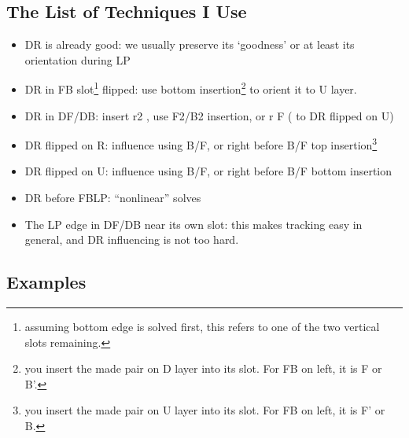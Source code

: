 \documentclass[12pt,letter]{article}
\begin{document}
\subsection{The List of Techniques I Use}

\begin{itemize}
    \item DR is already good: we usually preserve its ‘goodness’ or at least its orientation during LP
    
    \item DR in FB slot\footnote{assuming bottom edge is solved first, this refers to one of the two vertical slots remaining.} flipped: use bottom insertion\footnote{you insert the made pair on D layer into its slot. For FB on left, it is F or B’. } to orient it to U layer.
    
    \item DR in DF/DB: insert r2 , use F2/B2 insertion, or r F ( to DR flipped on U)

    \item DR flipped on R: influence using B/F, or right before B/F top insertion\footnote{you insert the made pair on U layer into its slot. For FB on left, it is F’ or B.}
    
    \item DR flipped on U: influence using B/F, or right before B/F bottom insertion
    
    \item DR before FBLP: “nonlinear” solves
    
    \item The LP edge in DF/DB near its own slot: this makes tracking easy in general, and DR influencing is not too hard.
    
\end{itemize}   

\subsection{Examples}
\end{document}
